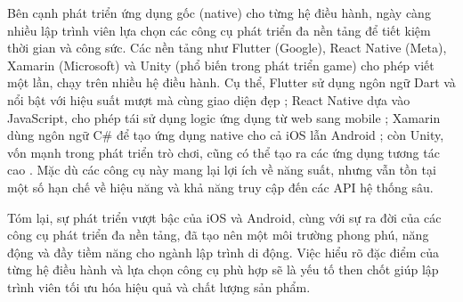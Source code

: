     \begin{flushleft}
      \hspace*{0.8cm}Bên cạnh phát triển ứng dụng gốc (native) cho từng hệ điều hành, ngày càng nhiều lập trình viên lựa chọn các công cụ phát triển đa nền tảng để tiết kiệm thời gian và công sức. Các nền tảng như Flutter (Google), React Native (Meta), Xamarin (Microsoft) và Unity (phổ biến trong phát triển game) cho phép viết một lần, chạy trên nhiều hệ điều hành. Cụ thể, Flutter sử dụng ngôn ngữ Dart và nổi bật với hiệu suất mượt mà cùng giao diện đẹp \cite{flutter}; React Native dựa vào JavaScript, cho phép tái sử dụng logic ứng dụng từ web sang mobile \cite{reactnative}; Xamarin dùng ngôn ngữ C\# để tạo ứng dụng native cho cả iOS lẫn Android \cite{xamarin}; còn Unity, vốn mạnh trong phát triển trò chơi, cũng có thể tạo ra các ứng dụng tương tác cao \cite{unity}. Mặc dù các công cụ này mang lại lợi ích về năng suất, nhưng vẫn tồn tại một số hạn chế về hiệu năng và khả năng truy cập đến các API hệ thống sâu.
    \end{flushleft}

    \begin{flushleft}
      \hspace*{0.8cm}Tóm lại, sự phát triển vượt bậc của iOS và Android, cùng với sự ra đời của các công cụ phát triển đa nền tảng, đã tạo nên một môi trường phong phú, năng động và đầy tiềm năng cho ngành lập trình di động. Việc hiểu rõ đặc điểm của từng hệ điều hành và lựa chọn công cụ phù hợp sẽ là yếu tố then chốt giúp lập trình viên tối ưu hóa hiệu quả và chất lượng sản phẩm.
    \end{flushleft}